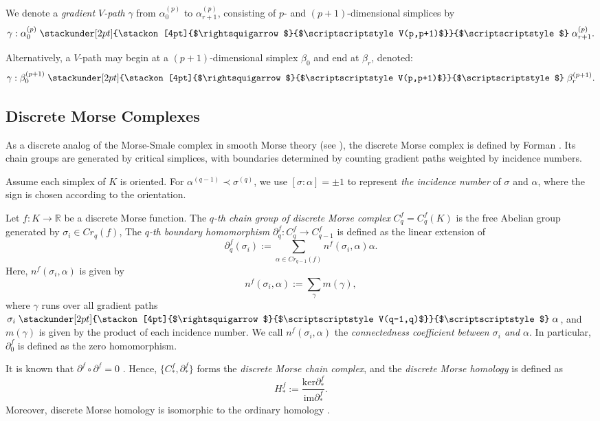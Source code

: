 \documentclass[a4paper,12pt,notitlepage]{amsart}
\theoremstyle{definition}%
\theoremstyle{definition}%
\theoremstyle{definition}%
\newcommand\stackrqarrow[2]{%
    \mathrel{\stackunder[2pt]{\stackon[4pt]{$\rightsquigarrow$}{$\scriptscriptstyle#1$}}{%
            $\scriptscriptstyle#2$}}}
\begin{document}
We denote a \textit{gradient  $V$-path} $\gamma$ 
from 
$\alpha_0^{(p)} $ to 
$\alpha_{r+1}^{(p)}$,
consisting of $p$- and $(p+1)$-dimensional 
simplices
by 
$$\gamma: \alpha_0^{(p)}  \stackrqarrow{V(p,p+1)}{}  \alpha_{r+1}^{(p)}. $$


Alternatively, a $V$-path may begin at a 
$(p+1)$-dimensional simplex $\beta_0$ and end at $\beta_r$,
denoted:
$$\gamma: \beta_0^{(p+1)} \stackrqarrow{V(p,p+1)}{}  \beta_r^{(p+1)}. $$




\subsection{Discrete Morse Complexes}

As a discrete analog of the 
Morse-Smale complex in smooth Morse theory (see \cite{Milnor, Guest}), 
the discrete Morse complex is defined  by Forman \cite{Forman_guide}.
Its chain groups 
are generated by critical simplices, with 
boundaries determined by counting 
gradient paths weighted by incidence numbers.

Assume each simplex of $K$ is oriented.
For $\alpha^{(q-1)}\prec \sigma^{(q)}$,
we use $[ \sigma : \alpha]=\pm 1$ to represent \textit{the incidence number} of 
 $\sigma$ and $ \alpha$,
where the sign is chosen according to the orientation.

Let $f:K\to \mathbb{R}$ be a discrete Morse function.
The \textit{$q$-th chain group of discrete Morse complex} 
$C_q^f= C_q^f(K)$
is the free Abelian group generated by
 $\sigma_i \in Cr_q(f)$,  
The
\textit{$q$-th boundary homomorphism}
$\partial_{q}^{f}: C_q^f \to C_{q-1}^f$  
is defined as the linear extension 
of
$$\partial_{q}^{f}(\sigma_i):= \sum_{ \alpha \in Cr_{q-1}(f)} n^{f}(\sigma_i, \alpha) \alpha.$$
Here, $n^{f}(\sigma_i, \alpha)$ is 
given by
$$n^{f}(\sigma_i, \alpha):= \sum_{\gamma } m(\gamma),$$
where $\gamma$ 
runs over all gradient paths $\sigma_i \stackrqarrow{V(q-1,q)}{}\alpha$,
and
$m(\gamma)$ is given by the product of 
each incidence number.
We call $n^{f}(\sigma_i, \alpha)$
the \textit{connectedness coefficient between  
$\sigma_i$ and  $\alpha$}.
In particular, $\partial_{0}^{f}$ is defined as
 the zero homomorphism.
 
 

It is known that 
$\partial^f \circ \partial^f=0$ \cite[Theorem 7.1]{Forman_guide}.  
Hence, $\{C_{\ast}^f, \partial_{\ast}^f \}$ 
forms the \textit{discrete Morse chain complex},
and the \textit{discrete Morse homology}
is defined as 
$$H_{\ast}^f:= \frac{\text{ker} \partial^f_{\ast} }{\text{im} \partial^f_{\ast}}.$$
Moreover, discrete Morse homology is 
isomorphic to the ordinary homology \cite[Theorem 7.1]{Forman_guide}.
\end{document}
